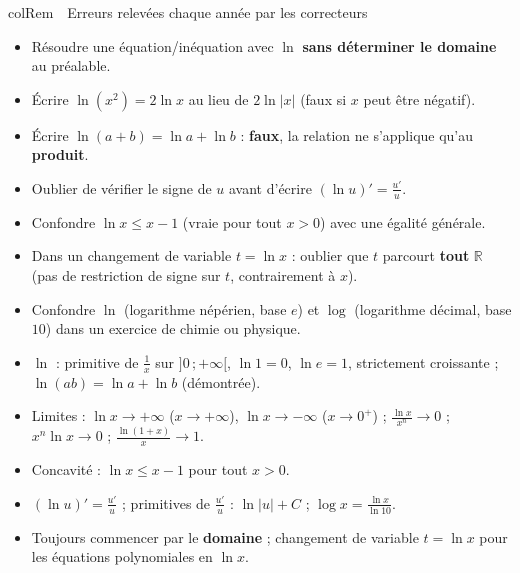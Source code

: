 \documentclass[11pt,a4paper]{article}
\newenvironment{remarque}[1][Remarque]
  {\begin{fiche}{colRem}{\ding{43}~~#1}}{\end{fiche}}
\begin{document}
\begin{remarque}[Erreurs relevées chaque année par les correcteurs]
\begin{itemize}[leftmargin=6mm, itemsep=0.5mm]
  \item Résoudre une équation/inéquation avec $\ln$ \textbf{sans déterminer le domaine} au préalable.
  \item Écrire $\ln(x^2) = 2\ln x$ au lieu de $2\ln|x|$ (faux si $x$ peut être négatif).
  \item Écrire $\ln(a+b) = \ln a + \ln b$ : \textbf{faux}, la relation ne s'applique qu'au \textbf{produit}.
  \item Oublier de vérifier le signe de $u$ avant d'écrire $(\ln u)' = \frac{u'}{u}$.
  \item Confondre $\ln x \leq x - 1$ (vraie pour tout $x>0$) avec une égalité générale.
  \item Dans un changement de variable $t=\ln x$ : oublier que $t$ parcourt \textbf{tout} $\mathbb{R}$ (pas de restriction de signe sur $t$, contrairement à $x$).
  \item Confondre $\ln$ (logarithme népérien, base $e$) et $\log$ (logarithme décimal, base $10$) dans un exercice de chimie ou physique.
\end{itemize}
\end{remarque}

\vspace{4mm}
\begin{tcolorbox}[
  enhanced, boxrule=0pt, arc=2mm,
  interior style={left color=qtealdark, right color=qteal},
  left=6mm, right=6mm, top=4mm, bottom=4mm,
  fontupper=\color{white}\sffamily,
  title={\sffamily\bfseries\color{white}\ding{72}~~À retenir},
  colbacktitle=qtealdark, coltitle=white, boxrule=0pt
]
\begin{itemize}[leftmargin=6mm, label={\color{qamber}}, itemsep=1mm]
  \item $\ln$ : primitive de $\frac1x$ sur $]0\,;+\infty[$, $\ln1=0$, $\ln e=1$, strictement croissante ; $\ln(ab)=\ln a+\ln b$ (démontrée).
  \item Limites : $\ln x\to+\infty$ ($x\to+\infty$), $\ln x\to-\infty$ ($x\to0^+$) ; $\frac{\ln x}{x^n}\to0$ ; $x^n\ln x\to0$ ; $\frac{\ln(1+x)}{x}\to1$.
  \item Concavité : $\ln x \leq x-1$ pour tout $x>0$.
  \item $(\ln u)'=\frac{u'}{u}$ ; primitives de $\frac{u'}{u}$ : $\ln|u|+C$ ; $\log x=\frac{\ln x}{\ln10}$.
  \item Toujours commencer par le \textbf{domaine} ; changement de variable $t=\ln x$ pour les équations polynomiales en $\ln x$.
\end{itemize}
\end{tcolorbox}
\end{document}

